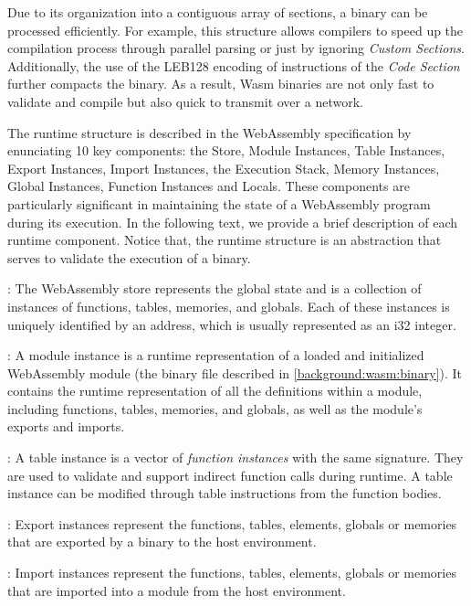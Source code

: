 \vspace{2mm}
Due to its organization into a contiguous array of sections, a \wasm binary can be processed efficiently. 
For example, this structure allows compilers to speed up the compilation process through parallel parsing or just by ignoring \emph{Custom Sections}.
Additionally, the use of the LEB128 encoding of instructions of the \emph{Code Section} further compacts the binary. 
As a result, Wasm binaries are not only fast to validate and compile but also quick to transmit over a network.

\label{background:wasm:execution}


The \Wasm runtime structure is described in the WebAssembly specification by enunciating 10 key components: the Store, Module Instances,  Table Instances, Export Instances, Import Instances, the Execution Stack, Memory Instances, Global Instances, Function Instances and Locals.  
These components are particularly significant in maintaining the state of a WebAssembly program during its execution. 
In the following text, we provide a brief description of each runtime component.
Notice that, the runtime structure is an abstraction that serves to validate the execution of a \wasm binary.

: The WebAssembly store represents the global state and is a collection of instances of functions, tables, memories, and globals. Each of these instances is uniquely identified by an address, which is usually represented as an i32 integer.


: A module instance is a runtime representation of a loaded and initialized WebAssembly module (the binary file described in \autoref{background:wasm:binary}). 
It contains the runtime representation of all the definitions within a module, including functions, tables, memories, and globals, as well as the module's exports and imports.


: A table instance is a vector of \emph{function instances} with the same signature. 
They are used to validate and support indirect function calls during runtime.
A table instance can be modified through table instructions from the function bodies.


: Export instances represent the functions, tables, elements, globals or memories that are exported by a \wasm binary to the host environment. 

: Import instances represent the functions, tables, elements, globals or memories that are imported into a module from the host environment. 

